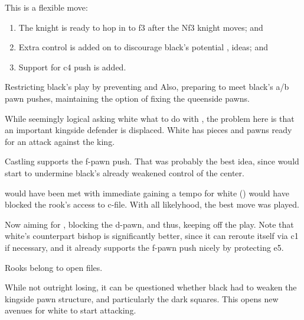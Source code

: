 
This is a flexible move:
\begin{enumerate}
\item The knight is ready to
hop in to f3 after the Nf3 knight moves; and
\item Extra control is added on  to discourage black's
potential ,  ideas; and
\item Support for c4 push is added.
\end{enumerate}


Restricting black's play by preventing  and 
Also, preparing to meet black's a/b pawn pushes, maintaining the
option of fixing the queenside pawns.


While seemingly logical asking white what to do with , the problem here
is that an important kingside defender is displaced. White has pieces
and pawns ready for an attack against the king.


Castling supports the f-pawn push. That was probably the best idea,
since  would start to undermine black's already weakened control of
the center.


 would have been met with immediate  gaining a
tempo for white ()  would
have blocked the rook's access to c-file. With all likelyhood, the
best move was played.


Now aiming for , blocking the d-pawn, and thus,
keeping  off the play. Note that white's counterpart bishop
is significantly better, since it
can reroute itself via c1 if necessary, and it already supports the f-pawn
push nicely by protecting e5.


Rooks belong to open files.



While not outright losing, it can be questioned whether black had to
weaken the kingside pawn structure, and particularly the dark
squares. This opens new avenues for white to start attacking.

